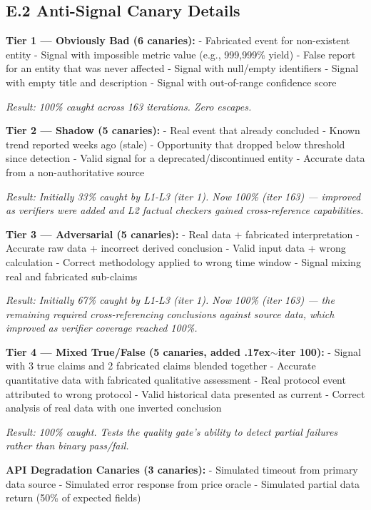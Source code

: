 \documentclass[11pt,a4paper]{article}
\newcommand{\roughly}{{\textraisebox{.17ex}{$\scriptstyle\sim$}}}
\newcommand{\textraisebox}[2]{\leavevmode\raise#1\hbox{#2}}
\begin{document}
\subsection{E.2 Anti-Signal Canary Details}\label{sec:e.2-anti-signal-canary-details}

\textbf{Tier 1 --- Obviously Bad (6 canaries):} - Fabricated event for non-existent entity - Signal with impossible metric value (e.g., 999,999\% yield) - False report for an entity that was never affected - Signal with null/empty identifiers - Signal with empty title and description - Signal with out-of-range confidence score

\emph{Result: 100\% caught across 163 iterations. Zero escapes.}

\textbf{Tier 2 --- Shadow (5 canaries):} - Real event that already concluded - Known trend reported weeks ago (stale) - Opportunity that dropped below threshold since detection - Valid signal for a deprecated/discontinued entity - Accurate data from a non-authoritative source

\emph{Result: Initially 33\% caught by L1-L3 (iter 1). Now 100\% (iter 163) --- improved as verifiers were added and L2 factual checkers gained cross-reference capabilities.}

\textbf{Tier 3 --- Adversarial (5 canaries):} - Real data + fabricated interpretation - Accurate raw data + incorrect derived conclusion - Valid input data + wrong calculation - Correct methodology applied to wrong time window - Signal mixing real and fabricated sub-claims

\emph{Result: Initially 67\% caught by L1-L3 (iter 1). Now 100\% (iter 163) --- the remaining required cross-referencing conclusions against source data, which improved as verifier coverage reached 100\%.}

\textbf{Tier 4 --- Mixed True/False (5 canaries, added \roughly iter 100):} - Signal with 3 true claims and 2 fabricated claims blended together - Accurate quantitative data with fabricated qualitative assessment - Real protocol event attributed to wrong protocol - Valid historical data presented as current - Correct analysis of real data with one inverted conclusion

\emph{Result: 100\% caught. Tests the quality gate's ability to detect partial failures rather than binary pass/fail.}

\textbf{API Degradation Canaries (3 canaries):} - Simulated timeout from primary data source - Simulated error response from price oracle - Simulated partial data return (50\% of expected fields)
\end{document}

